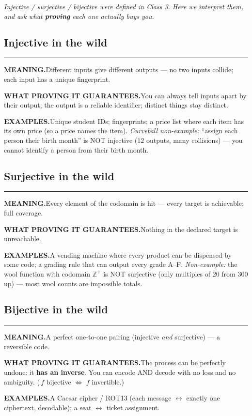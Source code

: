\documentclass[12pt]{article}
\begin{document}
\textit{Injective / surjective / bijective were defined in Class 3. Here we interpret them, and ask what \textbf{proving} each one actually buys you.}

\subsection*{Injective in the wild}
\hrule
\textbf{MEANING.}\quad Different inputs give different outputs --- no two inputs collide; each input has a unique fingerprint.

\textbf{WHAT PROVING IT GUARANTEES.}\quad You can always tell inputs apart by their output; the output is a reliable identifier; distinct things stay distinct.

\textbf{EXAMPLES.}\quad Unique student IDs; fingerprints; a price list where each item has its own price (so a price names the item). \textit{Curveball non-example:} ``assign each person their birth month'' is NOT injective ($12$ outputs, many collisions) --- you cannot identify a person from their birth month.

\subsection*{Surjective in the wild}
\hrule
\textbf{MEANING.}\quad Every element of the codomain is hit --- every target is achievable; full coverage.

\textbf{WHAT PROVING IT GUARANTEES.}\quad Nothing in the declared target is unreachable.

\textbf{EXAMPLES.}\quad A vending machine where every product can be dispensed by some code; a grading rule that can output every grade A--F. \textit{Non-example:} the wool function with codomain $\mathbb{Z}^+$ is NOT surjective (only multiples of $20$ from $300$ up) --- most wool counts are impossible totals.

\subsection*{Bijective in the wild}
\hrule
\textbf{MEANING.}\quad A perfect one-to-one pairing (injective \emph{and} surjective) --- a reversible code.

\textbf{WHAT PROVING IT GUARANTEES.}\quad The process can be perfectly undone: it \textbf{has an inverse}. You can encode AND decode with no loss and no ambiguity. (\,$f$ bijective $\iff$ $f$ invertible.)

\textbf{EXAMPLES.}\quad A Caesar cipher / ROT13 (each message $\leftrightarrow$ exactly one ciphertext, decodable); a seat $\leftrightarrow$ ticket assignment.
\end{document}
